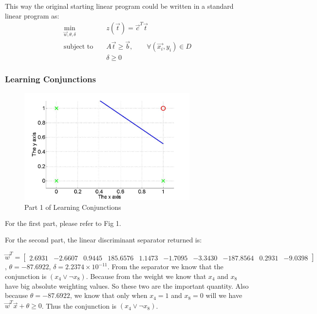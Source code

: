 \noindent This way the original starting linear program could be written in a standard linear program as:
\begin{eqnarray*}
\min_{\vec{w}, \theta, \delta} & & z(\vec{t})=\vec{c}^T\vec{t}  \label{eq:lin_prog_discriminant_obj}\\
\textrm{subject to } & & A\vec{t}\geq\vec{b}, \qquad \forall (\vec{x_i},y_i) \in D  \label{eq:lin_prog_discriminant_constraint}\\
& & \delta \geq 0  \label{eq:lin_prog_discriminant_bound}
\end{eqnarray*}

\subsubsection{Learning Conjunctions}

\begin{figure}[h!]
	\centering
	\includegraphics[width=0.8\textwidth]{learnConjunctions}
	\caption{Part 1 of Learning Conjunctions}
\end{figure}
\noindent For the first part, please refer to Fig 1.

\noindent For the second part, the linear discriminant separator returned is:

\noindent $\vec{w}^T =
\begin{bmatrix}
2.6931 & -2.6607 & 0.9445 & 185.6576 & 1.1473 & -1.7095 & -3.3430 & -187.8564 & 0.2931 & -9.0398
\end{bmatrix}$, $\theta=-87.6922$, $\delta=2.2374\times 10^{-11}$.
From the separator we know that the conjunction is $(x_4 \vee \neg x_8 )$. Because from the weight we know that $x_4$ and $x_8$ have big absolute weighting values. So these two are the important quantity. Also because $\theta=-87.6922$, we know that only when $x_4=1$ and $x_8=0$ will we have $\vec{w}^T\vec{x}+\theta\geq0$. Thus the conjunction is $(x_4 \vee \neg x_8 )$.

